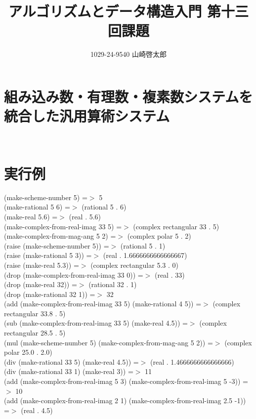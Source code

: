 ﻿\documentclass[a4paper,12pt]{article}
\title{アルゴリズムとデータ構造入門 第十三回課題}
\author{1029-24-9540 山崎啓太郎}
\begin{document}
\maketitle

\section{組み込み数・有理数・複素数システムを統合した汎用算術システム}
\lstset{numbers=left,basicstyle=\small}

\\
\section{実行例}
(make-scheme-number 5) =$>$ 5\\
(make-rational 5 6) =$>$ (rational 5 . 6)\\
(make-real 5.6) =$>$ (real . 5.6)\\
(make-complex-from-real-imag 33 5) =$>$ (complex rectangular 33 . 5)\\
(make-complex-from-mag-ang 5 2) =$>$ (complex polar 5 . 2)\\
(raise (make-scheme-number 5)) =$>$ (rational 5 . 1)\\
(raise (make-rational 5 3)) =$>$ (real . 1.6666666666666667)\\
(raise (make-real 5.3)) =$>$ (complex rectangular 5.3 . 0)\\
(drop (make-complex-from-real-imag 33 0)) =$>$ (real . 33)\\
(drop (make-real 32)) =$>$ (rational 32 . 1)\\
(drop (make-rational 32 1)) =$>$ 32\\
(add (make-complex-from-real-imag 33 5) (make-rational 4 5)) =$>$ (complex rectangular 33.8 . 5)\\
(sub (make-complex-from-real-imag 33 5) (make-real 4.5)) =$>$ (complex rectangular 28.5 . 5)\\
(mul (make-scheme-number 5) (make-complex-from-mag-ang 5 2)) =$>$ (complex polar 25.0 . 2.0)\\
(div (make-rational 33 5) (make-real 4.5)) =$>$ (real . 1.4666666666666666)\\
(div (make-rational 33 1) (make-real 3)) =$>$ 11\\
(add (make-complex-from-real-imag 5 3) (make-complex-from-real-imag 5 -3)) =$>$ 10\\
(add (make-complex-from-real-imag 2 1) (make-complex-from-real-imag 2.5 -1)) =$>$ (real . 4.5)\\
\\
\end{document}
